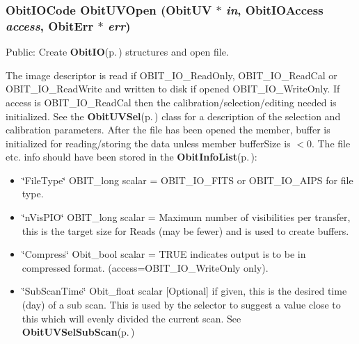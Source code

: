 \subsubsection{\setlength{\rightskip}{0pt plus 5cm}Obit\-IOCode Obit\-UVOpen ({\bf Obit\-UV} $\ast$ {\em in}, Obit\-IOAccess {\em access}, {\bf Obit\-Err} $\ast$ {\em err})}\label{ObitUV_8h_a34}


Public: Create {\bf Obit\-IO}{\rm (p.\,\pageref{structObitIO})} structures and open file. 

The image descriptor is read if OBIT\_\-IO\_\-Read\-Only, OBIT\_\-IO\_\-Read\-Cal or OBIT\_\-IO\_\-Read\-Write and written to disk if opened OBIT\_\-IO\_\-Write\-Only. If access is OBIT\_\-IO\_\-Read\-Cal then the calibration/selection/editing needed is initialized. See the {\bf Obit\-UVSel}{\rm (p.\,\pageref{structObitUVSel})} class for a description of the selection and calibration parameters. After the file has been opened the member, buffer is initialized for reading/storing the data unless member buffer\-Size is $<$0. The file etc. info should have been stored in the {\bf Obit\-Info\-List}{\rm (p.\,\pageref{structObitInfoList})}: \begin{itemize}
\item \char`\"{}File\-Type\char`\"{} OBIT\_\-long scalar = OBIT\_\-IO\_\-FITS or OBIT\_\-IO\_\-AIPS for file type. \item \char`\"{}n\-Vis\-PIO\char`\"{} OBIT\_\-long scalar = Maximum number of visibilities per transfer, this is the target size for Reads (may be fewer) and is used to create buffers. \item \char`\"{}Compress\char`\"{} Obit\_\-bool scalar = TRUE indicates output is to be in compressed format. (access=OBIT\_\-IO\_\-Write\-Only only). \item \char`\"{}Sub\-Scan\-Time\char`\"{} Obit\_\-float scalar [Optional] if given, this is the desired time (day) of a sub scan. This is used by the selector to suggest a value close to this which will evenly divided the current scan. See {\bf Obit\-UVSel\-Sub\-Scan}{\rm (p.\,\pageref{ObitUVSel_8c_a21})} 
\end{itemize}

